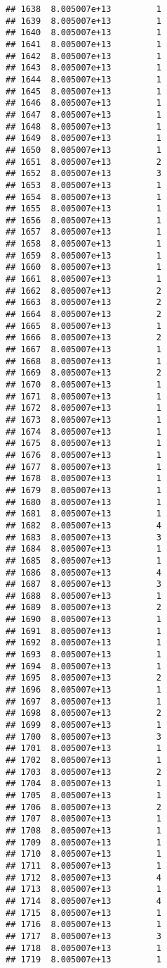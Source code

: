 \documentclass[
]{article}
\begin{document}
\begin{verbatim}
## 1638  8.005007e+13         1
## 1639  8.005007e+13         1
## 1640  8.005007e+13         1
## 1641  8.005007e+13         1
## 1642  8.005007e+13         1
## 1643  8.005007e+13         1
## 1644  8.005007e+13         1
## 1645  8.005007e+13         1
## 1646  8.005007e+13         1
## 1647  8.005007e+13         1
## 1648  8.005007e+13         1
## 1649  8.005007e+13         1
## 1650  8.005007e+13         1
## 1651  8.005007e+13         2
## 1652  8.005007e+13         3
## 1653  8.005007e+13         1
## 1654  8.005007e+13         1
## 1655  8.005007e+13         1
## 1656  8.005007e+13         1
## 1657  8.005007e+13         1
## 1658  8.005007e+13         1
## 1659  8.005007e+13         1
## 1660  8.005007e+13         1
## 1661  8.005007e+13         1
## 1662  8.005007e+13         2
## 1663  8.005007e+13         2
## 1664  8.005007e+13         2
## 1665  8.005007e+13         1
## 1666  8.005007e+13         2
## 1667  8.005007e+13         1
## 1668  8.005007e+13         1
## 1669  8.005007e+13         2
## 1670  8.005007e+13         1
## 1671  8.005007e+13         1
## 1672  8.005007e+13         1
## 1673  8.005007e+13         1
## 1674  8.005007e+13         1
## 1675  8.005007e+13         1
## 1676  8.005007e+13         1
## 1677  8.005007e+13         1
## 1678  8.005007e+13         1
## 1679  8.005007e+13         1
## 1680  8.005007e+13         1
## 1681  8.005007e+13         1
## 1682  8.005007e+13         4
## 1683  8.005007e+13         3
## 1684  8.005007e+13         1
## 1685  8.005007e+13         1
## 1686  8.005007e+13         4
## 1687  8.005007e+13         3
## 1688  8.005007e+13         1
## 1689  8.005007e+13         2
## 1690  8.005007e+13         1
## 1691  8.005007e+13         1
## 1692  8.005007e+13         1
## 1693  8.005007e+13         1
## 1694  8.005007e+13         1
## 1695  8.005007e+13         2
## 1696  8.005007e+13         1
## 1697  8.005007e+13         1
## 1698  8.005007e+13         2
## 1699  8.005007e+13         1
## 1700  8.005007e+13         3
## 1701  8.005007e+13         1
## 1702  8.005007e+13         1
## 1703  8.005007e+13         2
## 1704  8.005007e+13         1
## 1705  8.005007e+13         1
## 1706  8.005007e+13         2
## 1707  8.005007e+13         1
## 1708  8.005007e+13         1
## 1709  8.005007e+13         1
## 1710  8.005007e+13         1
## 1711  8.005007e+13         1
## 1712  8.005007e+13         4
## 1713  8.005007e+13         1
## 1714  8.005007e+13         4
## 1715  8.005007e+13         1
## 1716  8.005007e+13         1
## 1717  8.005007e+13         3
## 1718  8.005007e+13         1
## 1719  8.005007e+13         1

\end{verbatim}
\end{document}
